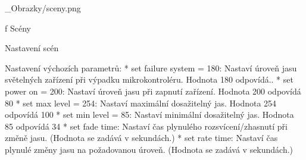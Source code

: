 








\medskip {}
\picw=16cm _Obrazky/sceny.png
\caption/f Scény
\medskip



\sec Nastavení scén


\medskip\noindent
{\sbf Nastavení výchozích parametrů:}
\begitems
    * {\sbf set failure system = 180:} Nastaví úroveň jasu světelných zařízení při výpadku mikrokontroléru. Hodnota 180 odpovídá..
    * {\sbf set power on = 200:} Nastaví úroveň jasu při zapnutí zařízení. Hodnota 200 odpovídá 80%
    * {\sbf set max level = 254:} Nastaví maximální dosažitelný jas. Hodnota 254 odpovídá 100%
    * {\sbf set min level = 85:} Nastaví minimální dosažitelný jas. Hodnota 85 odpovídá 34%
    * {\sbf set fade time:} Nastaví čas plynulého rozsvícení/zhasnutí při změně jasu. (Hodnota se zadává v sekundách.)
    * {\sbf set rate time:} Nastaví čas plynulé změny jasu na požadovanou úroveň. (Hodnota se zadává v sekundách.)
\enditems

